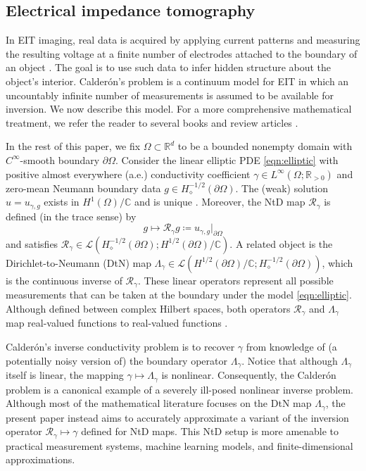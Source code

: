 \documentclass[pdflatex,sn-mathphys-num]{sn-jnl-preprint}
\newcommand{\R}{\mathbb{R}}
\newcommand{\C}{\mathbb{C}}
\newcommand{\sL}{\mathscr{L}}
\newcommand{\pOmega}{{\partial\Omega}}
\newcommand{\dtn}{\Lambda_{\gamma}}
\newcommand{\ntd}{\mathscr{R}_{\gamma}}
\newcommand{\defeq}{\coloneqq} %
\theoremstyle{thmstyleone}%
\theoremstyle{thmstyletwo}%
\theoremstyle{thmstylethree}%
\numberwithin{equation}{section}
\numberwithin{theorem}{section}
\begin{document}
\subsection{Electrical impedance tomography}\label{sec:prelim_eit}
In EIT imaging, real data is acquired by applying current patterns and measuring the resulting voltage at a finite number of electrodes attached to the boundary of an object \cite{cheney1999electrical}. The goal is to use such data to infer hidden structure about the object's interior. Calder\'on's problem \cite{calderon2006inverse} is a continuum model for EIT in which an uncountably infinite number of measurements is assumed to be available for inversion. We now describe this model. For a more comprehensive mathematical treatment, we refer the reader to several books and review articles \cite{feldman2025calderon,uhlmann2009electrical,uhlmann201230}.

In the rest of this paper, we fix $ \Omega\subset \R^d $ to be a bounded nonempty domain with $C^\infty$-smooth boundary $ \pOmega $. Consider the linear elliptic PDE \eqref{eqn:elliptic} with positive almost everywhere (a.e.) conductivity coefficient $ \gamma\in L^{\infty}(\Omega;\R_{>0}) $ and zero-mean Neumann boundary data $ g\in H_\diamond^{-1/2}(\pOmega) $. The (weak) solution $u=u_{\gamma,g}$ exists in $H^1(\Omega)/\C $ and is unique \cite[Chp.~2]{lions2012non}. Moreover, the NtD map $\ntd$ is defined (in the trace sense) by
\begin{equation}\label{eqn:ntd}
	g\mapsto \ntd g \defeq u_{\gamma,g}\big|_{\pOmega}
\end{equation}
and satisfies $ \ntd \in \sL(H_\diamond^{-1/2}(\pOmega);H_{\phantom{\diamond}}^{1/2}(\pOmega)/\C)$. A related object is the Dirichlet-to-Neumann (DtN) map $ \dtn \in \sL(H^{1/2}(\pOmega)/\C;H^{-1/2}_\diamond(\pOmega))$, which is the continuous inverse of $\ntd$. These linear operators represent all possible measurements that can be taken at the boundary under the model \eqref{eqn:elliptic}. Although defined between complex Hilbert spaces, both operators $\ntd$ and $\dtn$ map real-valued functions to real-valued functions \cite[Remark on p.~176]{abraham2019statistical}.

Calder\'on's inverse conductivity problem is to recover $ \gamma $ from knowledge of (a potentially noisy version of) the boundary operator $\dtn $. Notice that although $\dtn$ itself is linear, the mapping $\gamma\mapsto\dtn$ is nonlinear. Consequently, the Calder\'on problem is a canonical example of a severely ill-posed nonlinear inverse problem. Although most of the mathematical literature focuses on the DtN map $\dtn$, the present paper instead aims to accurately approximate a variant of the inversion operator $\ntd\mapsto \gamma$ defined for NtD maps. This NtD setup is more amenable to practical measurement systems, machine learning models, and finite-dimensional approximations.
\end{document}
